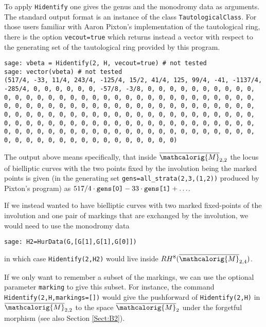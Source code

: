 \documentclass[11pt]{article}
\newcommand{\M}{\ensuremath{\overline{\mathcalorig{M}}}}
\begin{document}
To apply \verb|Hidentify| one gives the genus and the monodromy data as arguments.
The standard output format is an instance of the class \verb|TautologicalClass|. For those users familiar with Aaron Pixton's implementation of the tautological ring, there is the option \verb|vecout=true| which returns instead a vector with respect to the generating set of the tautological ring provided by this program.
\begin{lstlisting}
sage: vbeta = Hidentify(2, H, vecout=true) # not tested
sage: vector(vbeta) # not tested
(517/4, -33, 11/4, 243/4, -125/4, 15/2, 41/4, 125, 99/4, -41, -1137/4, -285/4, 0, 0, 0, 0, 0, 0, -57/8, -3/8, 0, 0, 0, 0, 0, 0, 0, 0, 0, 0, 0, 0, 0, 0, 0, 0, 0, 0, 0, 0, 0, 0, 0, 0, 0, 0, 0, 0, 0, 0, 0, 0, 0, 0, 0, 0, 0, 0, 0, 0, 0, 0, 0, 0, 0, 0, 0, 0, 0, 0, 0, 0, 0, 0, 0, 0, 0, 0, 0, 0, 0, 0, 0, 0, 0, 0, 0, 0, 0, 0, 0, 0, 0, 0, 0, 0, 0, 0, 0, 0, 0, 0, 0, 0, 0, 0, 0, 0, 0, 0, 0, 0, 0, 0, 0, 0, 0, 0, 0, 0, 0, 0, 0, 0, 0, 0, 0, 0, 0, 0, 0, 0, 0, 0, 0, 0, 0, 0, 0, 0, 0, 0, 0, 0, 0, 0, 0, 0, 0, 0, 0, 0, 0, 0, 0, 0, 0, 0, 0, 0, 0)
\end{lstlisting}
The output above means specifically, that inside $\M_{2,2}$ the locus of bielliptic curves with the two points fixed by the involution being the marked points is given (in the generating set \verb|gens=all_strata(2,3,(1,2))| produced by Pixton's program) as $517/4 \cdot \verb|gens[0]| - 33 \cdot \verb|gens[1]| + \ldots$.

If we instead wanted to have bielliptic curves with two marked fixed-points of the involution and one pair of markings that are exchanged by the involution, we would need to use the monodromy data
\begin{lstlisting}
sage: H2=HurData(G,[G[1],G[1],G[0]])
\end{lstlisting}
in which case \verb|Hidentify(2,H2)| would live inside $RH^{8}(\M_{2,4})$.

If we only want to remember a subset of the markings, we can use the optional parameter \verb|marking| to give this subset. For instance, the command \verb|Hidentify(2,H,markings=[])| would give the pushforward of \verb|Hidentify(2,H)| in $\M_{2,2}$ to the space $\M_2$ under the forgetful morphism (see also Section \ref{Sect:B2}).

\end{document}
